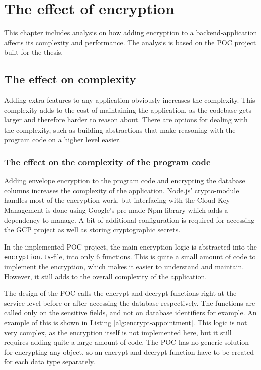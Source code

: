 \chapter{The effect of encryption} \label{effect of encryption}

This chapter includes analysis on how adding encryption to a backend-application affects its complexity and performance.
The analysis is based on the POC project built for the thesis.

\section{The effect on complexity}

Adding extra features to any application obviously increases the complexity.
This complexity adds to the cost of maintaining the application, as the codebase gets larger and therefore harder to reason about.
There are options for dealing with the complexity, such as building abstractions that make reasoning with the program code on a higher level easier.
\cite{complexity-triggers}

\subsection{The effect on the complexity of the program code}

Adding envelope encryption to the program code and encrypting the database columns increases the complexity of the application.
Node.js’ crypto-module handles most of the encryption work, but interfacing with the Cloud Key Management is done using Google’s pre-made Npm-library which adds a dependency to manage.
A bit of additional configuration is required for accessing the GCP project as well as storing cryptographic secrets.

In the implemented POC project, the main encryption logic is abstracted into the \texttt{encryption.ts}-file, into only 6 functions.
This is quite a small amount of code to implement the encryption, which makes it easier to understand and maintain.
However, it still adds to the overall complexity of the application.

The design of the POC calls the encrypt and decrypt functions right at the service-level before or after accessing the database respectively.
The functions are called only on the sensitive fields, and not on database identifiers for example.
An example of this is shown in Listing \ref{alg:encrypt-appointment}.
This logic is not very complex, as the encryption itself is not implemented here, but it still requires adding quite a large amount of code.
The POC has no generic solution for encrypting any object, so an encrypt and decrypt function have to be created for each data type separately.

